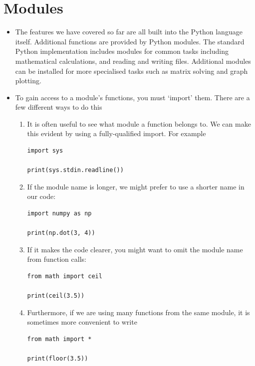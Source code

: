 \documentclass[a4paper,twoside,titlepage]{memoir}
\newcommand{\shellcmd}{\texttt}
\begin{document}
\section{Modules}
\begin{itemize}
\item The features we have covered so far are all built into the Python language itself.  Additional functions are provided by Python modules.  The standard Python implementation includes modules for common tasks including mathematical calculations, and reading and writing files.  Additional modules can be installed for more specialised tasks such as matrix solving and graph plotting.
\item To gain access to a module's functions, you must `import' them.  There are a few different ways to do this
\index{import@\shellcmd{import}}
\begin{enumerate}
	\item It is often useful to see what module a function belongs to.  We can make this evident by using a fully-qualified import.  For example
\begin{verbatim}
import sys

print(sys.stdin.readline())
\end{verbatim}
	\item If the module name is longer, we might prefer to use a shorter name in our code:
\begin{verbatim}
import numpy as np

print(np.dot(3, 4))
\end{verbatim}
	\item If it makes the code clearer, you might want to omit the module name from function calls:
\begin{verbatim}
from math import ceil

print(ceil(3.5))
\end{verbatim}
	\item Furthermore, if we are using many functions from the same module, it is sometimes more convenient to write
\begin{verbatim}
from math import *

print(floor(3.5))
\end{verbatim}
\end{enumerate}
\end{itemize}
\end{document}
